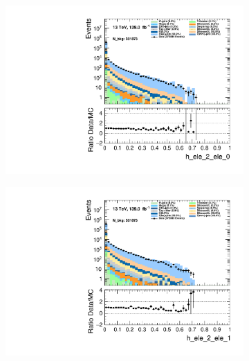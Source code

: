 \begin{figure}
    \centering
    \begin{subfigure}{.49\textwidth}
        \includegraphics[width=\textwidth]{Figures/MC_Data_comp/h_ele_2_ele_0.pdf}
        \caption{}
        \label{fig:et}
    \end{subfigure}
    \hfill
    \begin{subfigure}{.49\textwidth}
        \includegraphics[width=\textwidth]{Figures/MC_Data_comp/h_ele_2_ele_1.pdf}
        \caption{ }
        \label{fig:flcp}
    \end{subfigure}
    \hfill 
    \begin{subfigure}{.49\textwidth}

\end{subfigure}
\end{figure}
